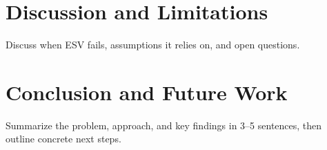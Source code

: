 \documentclass[letterpaper]{article} %
\newcommand{\method}{\textsc{ESV}}   %
\begin{document}
\section{Discussion and Limitations}
Discuss when \method{} fails, assumptions it relies on, and open questions.

\section{Conclusion and Future Work}
Summarize the problem, approach, and key findings in 3--5 sentences, then
outline concrete next steps.




\clearpage
\appendix
\renewcommand{\topfraction}{0.95}
\renewcommand{\bottomfraction}{0.9}
\renewcommand{\textfraction}{0.05}
\setcounter{topnumber}{4}
\setcounter{bottomnumber}{3}
\setcounter{totalnumber}{8}
\end{document}
